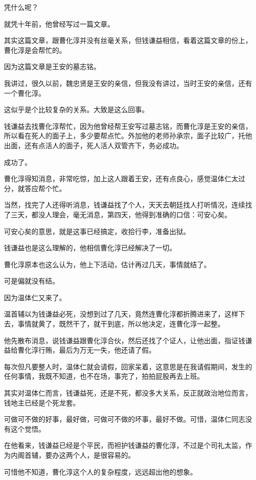 \begin{multicols}{\theparacolNo}
		凭什么呢？

		就凭十年前，他曾经写过一篇文章。

		其实这篇文章，跟曹化淳并没有丝毫关系，但钱谦益相信，看着这篇文章的份上，曹化淳是会帮忙的。

		因为这篇文章是王安的墓志铭。

		我讲过，很久以前，魏忠贤是王安的亲信，但我没有讲过，当时王安的亲信，还有一个曹化淳。

		这似乎是个比较复杂的关系。大致是这么回事。

		钱谦益去找曹化淳帮忙，因为他曾经帮王安写过墓志铭，而曹化淳是王安的亲信，所以看在死人的面子上，多少要帮点忙。外加他的老师孙承宗，面子比较广，托他出面，还有点活人的面子，死人活人双管齐下，务必成功。

		成功了。

		曹化淳得知消息，非常吃惊，加上这人跟着王安，还有点良心，感觉温体仁太过分，就答应帮个忙。

		当然，找完了人还得听消息，钱谦益找了个人，天天去朝廷找人打听情况，连续找了三天，都没人理会，毫无消息，第四天，他得到准确的口信：可安心矣。

		可安心矣的意思，就是这事已经搞定，收拾行李，准备出狱。

		钱谦益也是这么理解的，他相信曹化淳已经解决了一切。

		曹化淳原本也这么认为，他上下活动，估计再过几天，事情就结了。

		可是偏就没有结。

		因为温体仁又来了。

		温首辅以为钱谦益必死，没想到过了几天，竟然连曹化淳都折腾进来了，这样下去，事情就黄了，既然干了，就干到底，所以他决定，连曹化淳一起整。

		他先散布消息，说钱谦益跟曹化淳合伙，然后还找了个证人，让他出面，指证钱谦益给曹化淳行贿，最后为万无一失，他还请了假。

		每次但凡要整人时，温体仁就会请假，回家呆着，这意思是在我请假期间，发生的任何事情，我既不知道，也不在场，事完了，拍拍屁股再去上班。

		其实对温体仁而言，钱谦益死，还是不死，都没多大关系，反正就政治地位而言，钱地主已经是个死龙套。

		可做可不做的好事，最好做，可做可不做的坏事，最好不做。可惜，温体仁同志没有这个觉悟。

		在他看来，钱谦益已经是个平民，而袒护钱谦益的曹化淳，不过是个司礼太监，作为内阁首辅，要办这两个人，是很容易的。

		可惜他不知道，曹化淳这个人的复杂程度，远远超出他的想象。


\end{multicols}
